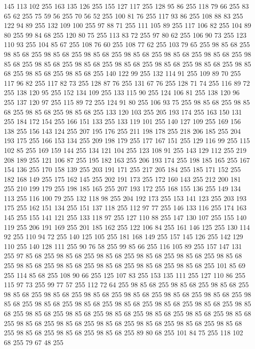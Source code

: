 145 113 102 255 163 135 126 255 155 127 117 255 128 95 86 255 118 79 66 255 83 65 62 255 75 59 56 255 70 56 52 255 100 81 76 255 117 93 86 255 108 88 83 255 122 94 89 255 132 109 100 255 97 88 71 255 111 105 89 255 117 106 82 255 104 89 80 255 99 84 68 255 120 80 75 255 113 83 72 255 97 80 62 255 106 90 73 255 123 110 93 255 104 85 67 255 108 76 60 255 108 77 62 255 103 79 65 255 98 85 68 255 98 85 68 255 98 85 68 255 98 85 68 255 98 85 68 255 98 85 68 255 98 85 68 255 98 85 68 255 98 85 68 255 98 85 68 255 98 85 68 255 98 85 68 255 98 85 68 255 98 85 68 255 98 85 68 255 98 85 68 255 140 122 99 255 132 114 91 255 109 89 70 255 117 96 82 255 117 82 73 255 128 87 76 255 131 67 76 255 128 71 74 255 116 89 72 255 138 120 95 255 152 134 109 255 133 115 90 255 124 106 81 255 138 120 96 255 137 120 97 255 115 89 72 255 124 91 80 255 106 93 75 255 98 85 68 255 98 85 68 255 98 85 68 255
98 85 68 255 133 120 103 255 205 193 174 255 163 150 131 255 184 172 154 255 166 151 133 255 133 119 101 255 140 127 109 255 169 156 138 255 156 143 124 255 207 195 176 255 211 198 178 255 218 206 185 255 204 193 175 255 166 153 134 255 209 198 179 255 177 167 151 255 129 116 99 255 115 102 85 255 169 159 144 255 134 121 104 255 123 108 91 255 143 129 112 255 219 208 189 255 121 106 87 255 195 182 163 255 206 193 174 255 198 185 165 255 167 154 136 255 170 158 139 255 203 191 171 255 217 205 184 255 185 171 152 255 182 168 149 255 175 162 145 255 202 191 173 255 172 160 143 255 212 200 181 255 210 199 179 255 198 185 165 255 207 193 172 255 168 155 136 255 149 134 113 255 116 100 79 255 132 118 98 255 204 192 173 255 153 141 123 255 203 193 175 255 162 151 134 255 151 137 118 255 112 97 77 255 146 133 116 255 174 163 145 255 155 141 121 255 133 118 97 255 127 110 88 255 147 130 107 255 155 140 119 255 206 191 169 255 201 185 162 255 122 106 84 255 161 146 125 255 130 114 92 255 110 94 72 255
140 125 105 255 181 168 149 255 157 145 126 255 142 129 110 255 140 128 111 255 90 76 58 255 99 85 66 255 116 105 89 255 157 147 131 255 97 85 68 255 98 85 68 255 98 85 68 255 98 85 68 255 98 85 68 255 98 85 68 255 98 85 68 255 98 85 68 255 98 85 68 255 98 85 68 255 98 85 68 255 101 85 69 255 114 85 68 255 108 90 66 255 125 107 83 255 153 135 111 255 127 110 86 255 115 97 73 255 99 77 57 255 112 72 64 255 98 85 68 255 98 85 68 255 98 85 68 255 98 85 68 255 98 85 68 255 98 85 68 255 98 85 68 255 98 85 68 255 98 85 68 255 98 85 68 255 98 85 68 255 98 85 68 255 98 85 68 255 98 85 68 255 98 85 68 255 98 85 68 255 98 85 68 255 98 85 68 255 98 85 68 255 98 85 68 255 98 85 68 255 98 85 68 255 98 85 68 255 98 85 68 255 98 85 68 255 98 85 68 255 98 85 68 255 98 85 68 255 98 85 68 255 98 85 68 255 98 85 68 255 89 80 68 255 101 84 75 255 118 102 68 255 79 67 48 255
